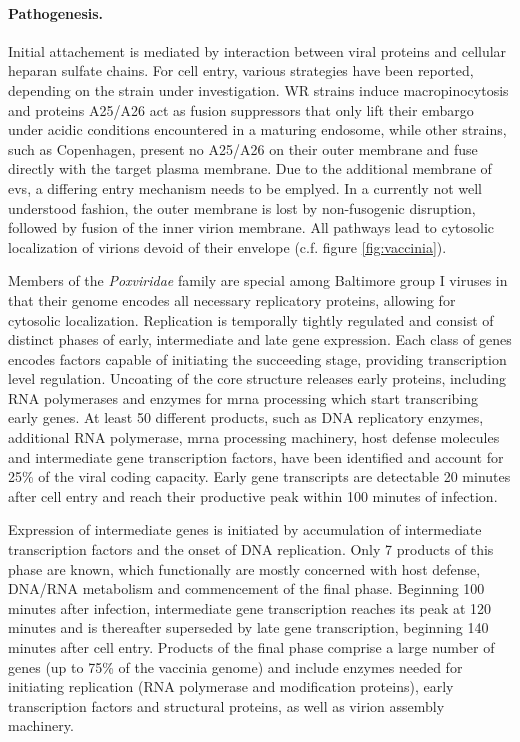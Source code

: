 \paragraph{Pathogenesis.}
Initial attachement is mediated by interaction between viral proteins and cellular heparan sulfate chains. For cell entry, various strategies have been reported, depending on the strain under investigation. WR strains induce macropinocytosis and proteins A25\slash A26 act as fusion suppressors that only lift their embargo under acidic conditions encountered in a maturing endosome, while other strains, such as Copenhagen, present no A25\slash A26 on their outer membrane and fuse directly with the target plasma membrane. Due to the additional membrane of \glspl{ev}, a differing entry mechanism needs to be emplyed. In a currently not well understood fashion, the outer membrane is lost by non-fusogenic disruption, followed by fusion of the inner virion membrane. All pathways lead to cytosolic localization of virions devoid of their envelope (c.f. figure \ref{fig:vaccinia}).

Members of the \textit{Poxviridae} family are special among Baltimore group I viruses in that their genome encodes all necessary replicatory proteins, allowing for cytosolic localization. Replication is temporally tightly regulated and consist of distinct phases of early, intermediate and late gene expression. Each class of genes encodes factors capable of initiating the succeeding stage, providing transcription level regulation. Uncoating of the core structure releases early proteins, including RNA polymerases and enzymes for \gls{mrna} processing which start transcribing early genes. At least 50 different products, such as DNA replicatory enzymes, additional RNA polymerase, \gls{mrna} processing machinery, host defense molecules and intermediate gene transcription factors, have been identified and account for 25\% of the viral coding capacity. Early gene transcripts are detectable 20 minutes after cell entry and reach their productive peak within 100 minutes of infection.

Expression of intermediate genes is initiated by accumulation of intermediate  transcription factors and the onset of DNA replication. Only 7 products of this phase are known, which functionally are mostly concerned with host defense, DNA\slash RNA metabolism and commencement of the final phase. Beginning 100 minutes after infection, intermediate gene transcription reaches its peak at 120 minutes and is thereafter superseded by late gene transcription, beginning 140 minutes after cell entry. Products of the final phase comprise a large number of genes (up to 75\% of the vaccinia genome) and include enzymes needed for initiating replication (RNA polymerase and modification proteins), early transcription factors and structural proteins, as well as virion assembly machinery.

